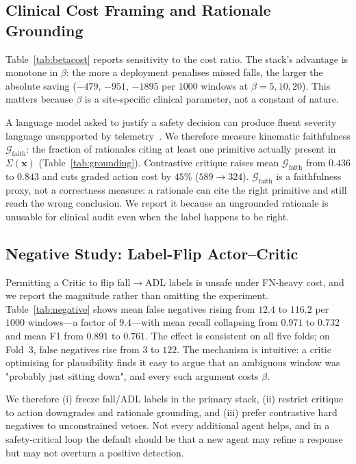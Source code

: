 \documentclass[journal]{IEEEtran}
\begin{document}


\subsection{Clinical Cost Framing and Rationale Grounding}
\label{sec:clinical}
Table~\ref{tab:betacost} reports sensitivity to the cost ratio. The stack's advantage is monotone in $\beta$: the more a deployment penalises missed falls, the larger the absolute saving ($-479$, $-951$, $-1895$ per $1000$ windows at $\beta=5,10,20$). This matters because $\beta$ is a site-specific clinical parameter, not a constant of nature.

A language model asked to justify a safety decision can produce fluent severity language unsupported by telemetry~\cite{huang2025hallucination}. We therefore measure kinematic faithfulness $\mathcal{G}_{\mathrm{faith}}$: the fraction of rationales citing at least one primitive actually present in $\Sigma(\mathbf{x})$ (Table~\ref{tab:grounding}). Contrastive critique raises mean $\mathcal{G}_{\mathrm{faith}}$ from $0.436$ to $0.843$ and cuts graded action cost by $45\%$ ($589{\rightarrow}324$). $\mathcal{G}_{\mathrm{faith}}$ is a faithfulness proxy, not a correctness measure: a rationale can cite the right primitive and still reach the wrong conclusion. We report it because an ungrounded rationale is unusable for clinical audit even when the label happens to be right.




\subsection{Negative Study: Label-Flip Actor--Critic}
\label{sec:negative}
Permitting a Critic to flip fall$\rightarrow$ADL labels is unsafe under FN-heavy cost, and we report the magnitude rather than omitting the experiment. Table~\ref{tab:negative} shows mean false negatives rising from $12.4$ to $116.2$ per $1000$ windows---a factor of $9.4$---with mean recall collapsing from $0.971$ to $0.732$ and mean F1 from $0.891$ to $0.761$. The effect is consistent on all five folds; on Fold~3, false negatives rise from $3$ to $122$. The mechanism is intuitive: a critic optimising for plausibility finds it easy to argue that an ambiguous window was "probably just sitting down", and every such argument costs $\beta$.

We therefore (i) freeze fall/ADL labels in the primary stack, (ii) restrict critique to action downgrades and rationale grounding, and (iii) prefer contrastive hard negatives to unconstrained vetoes. Not every additional agent helps, and in a safety-critical loop the default should be that a new agent may refine a response but may not overturn a positive detection.
\end{document}
